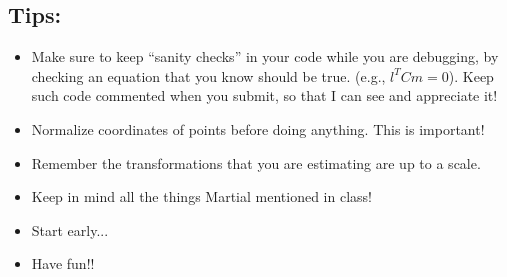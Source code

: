 \documentclass[11pt]{article}
\begin{document}
\subsection{Tips:}
\label{sec:helpercode}
\begin{itemize}
\item Make sure to keep ``sanity checks'' in your code while you are debugging, by checking an equation that you know should be true. (e.g., $l^TCm=0$). Keep such code commented when you submit, so that I can see and appreciate it!
\item Normalize coordinates of points before doing anything. This is important!
\item Remember the transformations that you are estimating are up to a scale.
\item Keep in mind all the things Martial mentioned in class!
\item Start early...
\item Have fun!!
\end{itemize}
\end{document}
